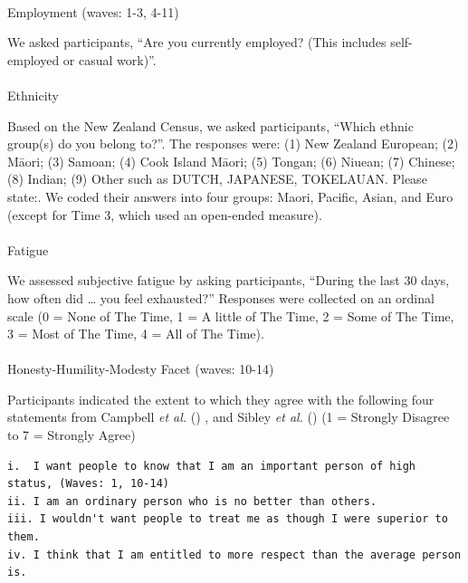 \documentclass[
  single column]{article}
\makeatletter
\let\oldparagraph\paragraph
\renewcommand{\paragraph}{
    \@ifstar
      \xxxParagraphStar
      \xxxParagraphNoStar
  }
\newcommand{\xxxParagraphStar}[1]{\oldparagraph*{#1}\mbox{}}
\newcommand{\xxxParagraphNoStar}[1]{\oldparagraph{#1}\mbox{}}
\makeatother
\begin{document}
\paragraph{Employment (waves: 1-3,
4-11)}\label{employment-waves-1-3-4-11}

We asked participants, ``Are you currently employed? (This includes
self-employed or casual work)''.

\paragraph{Ethnicity}\label{ethnicity}

Based on the New Zealand Census, we asked participants, ``Which ethnic
group(s) do you belong to?''. The responses were: (1) New Zealand
European; (2) Māori; (3) Samoan; (4) Cook Island Māori; (5) Tongan; (6)
Niuean; (7) Chinese; (8) Indian; (9) Other such as DUTCH, JAPANESE,
TOKELAUAN. Please state:. We coded their answers into four groups:
Maori, Pacific, Asian, and Euro (except for Time 3, which used an
open-ended measure).

\paragraph{Fatigue}\label{fatigue}

We assessed subjective fatigue by asking participants, ``During the last
30 days, how often did \ldots{} you feel exhausted?'' Responses were
collected on an ordinal scale (0 = None of The Time, 1 = A little of The
Time, 2 = Some of The Time, 3 = Most of The Time, 4 = All of The Time).

\paragraph{Honesty-Humility-Modesty Facet (waves:
10-14)}\label{honesty-humility-modesty-facet-waves-10-14}

Participants indicated the extent to which they agree with the following
four statements from Campbell \emph{et al.}
() , and Sibley \emph{et al.}
() (1 = Strongly Disagree to 7 = Strongly
Agree)

\begin{verbatim}
i.  I want people to know that I am an important person of high status, (Waves: 1, 10-14)
ii. I am an ordinary person who is no better than others.
iii. I wouldn't want people to treat me as though I were superior to them.
iv. I think that I am entitled to more respect than the average person is.
\end{verbatim}
\end{document}

